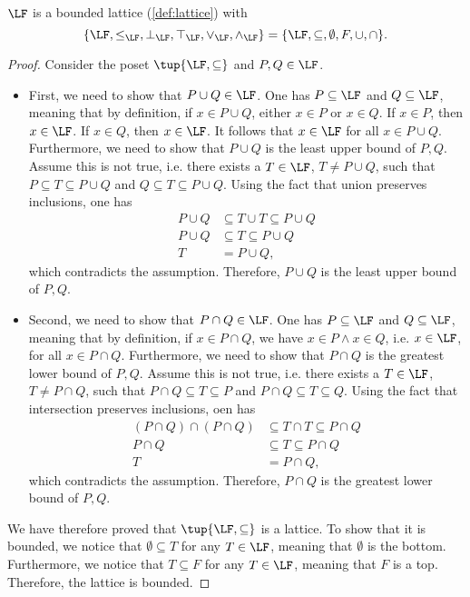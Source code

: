 \begin{lemma}
$\LF$ is a bounded lattice (\cref{def:lattice}) with 
\begin{equation}
    \{\LF,\leq_{\LF},\bot_{\LF},\top_{\LF},\vee_{\LF},\wedge_{\LF}\}=\{\LF,\subseteq,\emptyset,F,\cup,\cap\}.
\end{equation}
\end{lemma}
\begin{proof}
Consider the poset $\tup{\LF,\subseteq}$ and $P,Q\in \LF$.
\begin{itemize}
    \item First, we need to show that $P\cup Q\in \LF$. One has $P \subseteq \LF$ and $Q\subseteq \LF$, meaning that by definition, if $x\in P\cup Q$, either $x\in P$ or $x\in Q$. If $x\in P$, then $x\in \LF$. If $x\in Q$, then $x\in \LF$. It follows that $x\in \LF$ for all $x\in P\cup Q$. Furthermore, we need to show that $P\cup Q$ is the least upper bound of $P,Q$. Assume this is not true, i.e. there exists a $T\in \LF$, $T\neq P\cup Q$, such that $P\subseteq T\subseteq P\cup Q$ and $Q\subseteq T\subseteq P\cup Q$. Using the fact that union preserves inclusions, one has
\begin{equation}
\begin{aligned}
    P\cup Q &\subseteq T\cup T \subseteq P\cup Q\\
    P\cup Q &\subseteq T \subseteq P\cup Q\\
    T&= P\cup Q,
\end{aligned}
\end{equation}
which contradicts the assumption. Therefore, $P\cup Q$ is the least upper bound of $P,Q$.
\item Second, we need to show that $P\cap Q\in \LF$. One has $P\subseteq \LF$ and $Q\subseteq \LF$, meaning that by definition, if $x\in P\cap Q$, we have $x\in P\wedge x\in Q$, i.e. $x\in \LF$, for all $x\in P\cap Q$. Furthermore, we need to show that $P\cap Q$ is the greatest lower bound of $P,Q$. Assume this is not true, i.e. there exists a $T\in \LF$, $T\neq P\cap Q$, such that $P\cap Q\subseteq T\subseteq P$ and $P\cap Q\subseteq T\subseteq Q$. Using the fact that intersection preserves inclusions, oen has
\begin{equation}
    \begin{aligned}
    (P\cap Q)\cap (P\cap Q) &\subseteq T \cap T \subseteq P\cap Q\\
    P\cap Q &\subseteq T\subseteq P\cap Q\\
    T&=P\cap Q,
    \end{aligned}
\end{equation}
which contradicts the assumption.  Therefore, $P\cap Q$ is the greatest lower bound of $P,Q$.
\end{itemize}
We have therefore proved that $\tup{\LF,\subseteq}$ is a lattice. To show that it is bounded, we notice that $\emptyset \subseteq T$ for any $T\in \LF$, meaning that $\emptyset$ is the bottom. Furthermore, we notice that $T\subseteq F$ for any $T\in \LF$, meaning that $F$ is a top. Therefore, the lattice is bounded. 
\end{proof}

